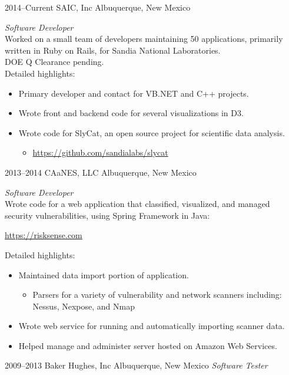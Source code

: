 \documentclass[]{friggeri-cv} %
\begin{document}
\begin{entrylist}
\entry
{2014--Current}
{SAIC, Inc}
{Albuquerque, New Mexico}
{\emph{Software Developer} \\
Worked on a small team of developers maintaining 50 applications, primarily written in Ruby on Rails, for Sandia National Laboratories.\\
DOE Q Clearance pending. \\
Detailed highlights:
\begin{itemize}
\item Primary developer and contact for VB.NET and C++ projects.
\item Wrote front and backend code for several visualizations in D3.
\item Wrote code for SlyCat, an open source project for scientific data analysis.
\begin{itemize}
		\item \href{https://github.com/sandialabs/slycat}{https://github.com/sandialabs/slycat}
\end{itemize}
\end{itemize}
}
\entry
{2013--2014}
{CAaNES, LLC}
{Albuquerque, New Mexico}
{\emph{Software Developer} \\
Wrote code for a web application that classified, visualized, and managed\\ security vulnerabilities, using Spring Framework in Java:
\begin{center}
	\href{https://risksense.com}{https://risksense.com}
\end{center}
Detailed highlights:
\begin{itemize}
\item Maintained data import portion of application.
\begin{itemize}
	\item Parsers for a variety of vulnerability and network scanners including: Nessus, Nexpose, and Nmap
\end{itemize}
\item Wrote web service for running and automatically importing scanner data.
\item Helped manage and administer server hosted on Amazon Web Services.
\end{itemize}}
\entry
{2009--2013}
{Baker Hughes, Inc}
{Albuquerque, New Mexico}
{\emph{Software Tester} \\
}
\end{entrylist}
\end{document}
